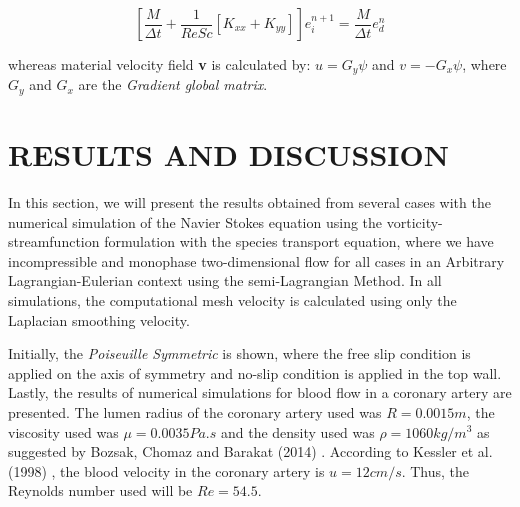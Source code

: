 \documentclass[10pt,fleqn,a4paper,twoside]{article}
\begin{document}
\vspace{-0.55cm}
\begin{equation}
 \left[
 \frac{M}{\Delta t} 
 + \frac{1}{\textit{ReSc}} \left[ K_{xx} + K_{yy} \right]
 \right] 
 e^{n+1}_{i}
 = \frac{M}{\Delta t} e^{n}_{d}
\end{equation}

\medskip
\noindent
whereas material velocity field \textbf{v} is calculated by:
$u =   G_{y} \psi$ and 
$v = - G_{x} \psi$, 
where 
$G_{y}$ and 
$G_{x}$ are the \textit{Gradient global matrix}.
 


\section{RESULTS AND DISCUSSION}


In this section, we will present the results obtained from 
several cases with the numerical simulation of the Navier Stokes 
equation using the vorticity-streamfunction formulation with 
the species transport equation, where we have incompressible 
and monophase two-dimensional flow for all cases
in an Arbitrary Lagrangian-Eulerian context
using the semi-Lagrangian Method. 
In all simulations, the computational mesh velocity is
calculated using only the Laplacian smoothing velocity.

\smallskip
Initially,
the \textit {Poiseuille Symmetric} is shown, where the 
free slip condition is applied on the axis of symmetry and no-slip condition is applied in the top wall. 
Lastly, the results of numerical simulations for 
blood flow in a coronary artery are presented. 
The lumen radius of the coronary artery used was $R=0.0015m$, 
the viscosity used was $\mu=0.0035Pa.s$ and the density used was
$\rho=1060kg/m^3$ as suggested by Bozsak, Chomaz and Barakat (2014)
 \cite{bozsak2014}. According to Kessler et al. (1998) 
\cite{kessler1998}, the blood velocity in the coronary artery 
is $u=12cm/s$. Thus, the Reynolds number used will be 
$Re=54.5$. 
\end{document}
